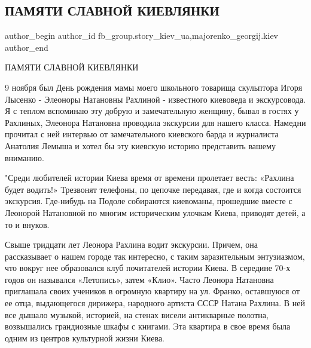  
 
 
 
 
 
\subsection{ПАМЯТИ СЛАВНОЙ КИЕВЛЯНКИ}
\label{sec:11_11_2021.fb.fb_group.story_kiev_ua.2.pamjat_rahlina_eleonora}
 
\ifcmt
 author_begin
   author_id fb_group.story_kiev_ua,majorenko_georgij.kiev
 author_end
\fi

ПАМЯТИ СЛАВНОЙ КИЕВЛЯНКИ

9 ноября был День рождения мамы моего школьного товарища скульптора Игоря
Лысенко - Элеоноры Натановны Рахлиной - известного киевоведа и экскурсовода. Я
с теплом вспоминаю эту добрую и замечательную женщину, бывал в гостях у
Рахлиных, Элеонора Натановна проводила экскурсии для нашего класса. Намедни
прочитал с ней интервью от замечательного киевского барда и журналиста Анатолия
Лемыша и хотел  бы эту киевскую историю представить вашему вниманию.


"Среди любителей истории Киева время от времени пролетает весть: «Рахлина будет
водить!» Трезвонят телефоны, по цепочке передавая, где и когда состоится
экскурсия. Где-нибудь на Подоле собираются киевоманы, прошедшие вместе с
Леонорой Натановной по многим историческим улочкам Киева, приводят детей, а то
и внуков. 

Свыше тридцати лет Леонора Рахлина водит экскурсии. Причем, она рассказывает о
нашем городе так интересно, с таким заразительным энтузиазмом, что вокруг нее
образовался клуб почитателей истории Киева. В середине 70-х годов он назывался
«Летопись», затем «Клио». Часто Леонора Натановна приглашала своих учеников в
огромную квартиру на ул. Франко, оставшуюся от ее отца, выдающегося дирижера,
народного артиста СССР Натана Рахлина. В ней все дышало музыкой, историей, на
стенах висели антикварные полотна, возвышались грандиозные шкафы с книгами. Эта
квартира в свое время была одним из центров культурной жизни Киева. 

